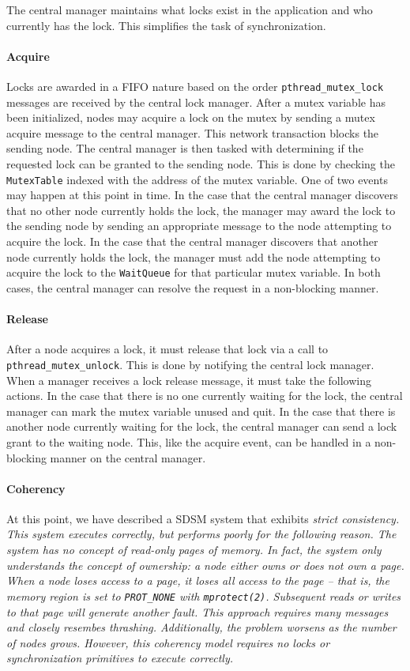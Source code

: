 The central manager maintains what locks exist in the application and who currently has the lock.  This simplifies the task of synchronization.

\paragraph{Acquire}
Locks are awarded in a FIFO nature based on the order \verb,pthread_mutex_lock, messages are received by the central lock manager.  After a mutex variable has been initialized, nodes may acquire a lock on the mutex by sending a mutex acquire message to the central manager.  This network transaction blocks the sending node.  The central manager is then tasked with determining if the requested lock can be granted to the sending node.  This is done by checking the \verb,MutexTable, indexed with the address of the mutex variable.  One of two events may happen at this point in time.  In the case that the central manager discovers that no other node currently holds the lock, the manager may award the lock to the sending node by sending an appropriate message to the node attempting to acquire the lock.  In the case that the central manager discovers that another node currently holds the lock, the manager must add the node attempting to acquire the lock to the \verb,WaitQueue, for that particular mutex variable.  In both cases, the central manager can resolve the request in a non-blocking manner.

\paragraph{Release}
After a node acquires a lock, it must release that lock via a call to \verb,pthread_mutex_unlock,.  This is done by notifying the central lock manager.  When a manager receives a lock release message, it must take the following actions.  In the case that there is no one currently waiting for the lock, the central manager can mark the mutex variable unused and quit.  In the case that there is another node currently waiting for the lock, the central manager can send a lock grant to the waiting node.  This, like the acquire event, can be handled in a non-blocking manner on the central manager.

\paragraph{Coherency}
At this point, we have described a SDSM system that exhibits \em strict consistency\em.  This system executes correctly, but performs poorly for the following reason.  The system has no concept of read-only pages of memory.  In fact, the system only understands the concept of ownership: a node either owns or does not own a page.  When a node loses access to a page, it loses \em all \em access to the page -- that is, the memory region is set to \verb,PROT_NONE, with \verb,mprotect(2),.  Subsequent reads or writes to that page will generate another fault.  This approach requires many messages and closely resembes thrashing.  Additionally, the problem worsens as the number of nodes grows.  However, this coherency model requires no locks or synchronization primitives to execute correctly.

